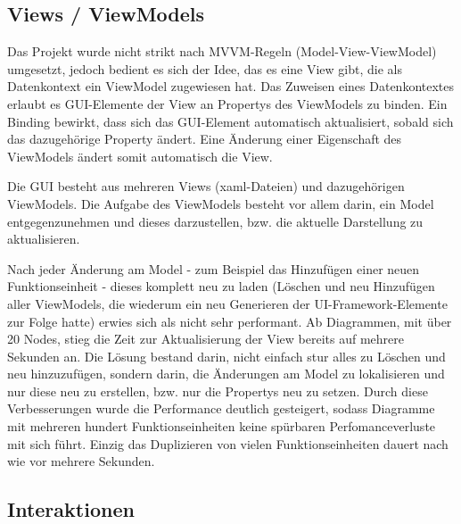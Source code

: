 \subsection{Views / ViewModels}

Das Projekt wurde nicht strikt nach MVVM-Regeln (Model-View-ViewModel) 
umgesetzt, jedoch bedient es sich der Idee, das es eine View gibt, die
als Datenkontext ein ViewModel zugewiesen hat. Das Zuweisen eines
Datenkontextes erlaubt es GUI-Elemente der View an Propertys des ViewModels zu
binden. Ein Binding bewirkt, dass sich das GUI-Element automatisch aktualisiert,
sobald sich das dazugehörige Property ändert. Eine Änderung einer
Eigenschaft des ViewModels ändert somit automatisch die View.

Die GUI besteht aus mehreren Views (xaml-Dateien) und dazugehörigen ViewModels.
Die Aufgabe des ViewModels besteht vor allem darin, ein Model entgegenzunehmen und dieses
darzustellen, bzw. die aktuelle Darstellung zu aktualisieren.

Nach jeder Änderung am Model - zum Beispiel das Hinzufügen einer neuen
Funktionseinheit -  dieses komplett neu zu laden (Löschen und neu Hinzufügen aller
ViewModels, die wiederum ein neu Generieren der UI-Framework-Elemente zur
Folge hatte) erwies sich als nicht sehr performant. 
Ab Diagrammen, mit über 20 Nodes, stieg die Zeit zur Aktualisierung der View
bereits auf mehrere Sekunden an.
Die Lösung bestand darin, nicht einfach stur alles zu Löschen und neu
hinzuzufügen, sondern darin, die Änderungen am Model zu lokalisieren und nur
diese neu zu erstellen, bzw. nur die Propertys neu zu setzen. Durch
diese Verbesserungen wurde die Performance deutlich gesteigert, sodass
Diagramme mit mehreren hundert Funktionseinheiten keine spürbaren Perfomanceverluste mit
sich führt. Einzig das Duplizieren von vielen Funktionseinheiten dauert nach wie vor
mehrere Sekunden. 

\subsection{Interaktionen}

